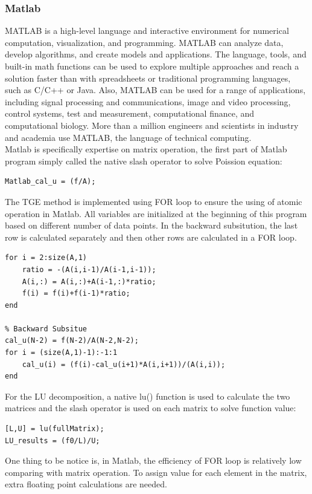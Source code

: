 \documentclass{article}
\begin{document}
\subsubsection{Matlab}
MATLAB is a high-level language and interactive environment for numerical computation, visualization, and programming. MATLAB can analyze data, develop algorithms, and create models and applications. The language, tools, and built-in math functions can be used to explore multiple approaches and reach a solution faster than with spreadsheets or traditional programming languages, such as C/C++ or Java. Also, MATLAB can be used for a range of applications, including signal processing and communications, image and video processing, control systems, test and measurement, computational finance, and computational biology. More than a million engineers and scientists in industry and academia use MATLAB, the language of technical computing. \\
Matlab is specifically expertise on matrix operation, the first part of Matlab program simply called the native slash operator to solve Poission equation:\\
 \begin{lstlisting}[frame=single]  
Matlab_cal_u = (f/A);
 \end{lstlisting}
 
 The TGE method is implemented using FOR loop to ensure the using of atomic operation in Matlab. All variables are initialized at the beginning of this program based on different number of data points. In the backward subsitution, the last row is calculated separately and then other rows are calculated in a FOR loop.
  \begin{lstlisting}[frame=single]  
% Forward Subsitute
for i = 2:size(A,1)
	ratio = -(A(i,i-1)/A(i-1,i-1));
	A(i,:) = A(i,:)+A(i-1,:)*ratio;
	f(i) = f(i)+f(i-1)*ratio;
end

% Backward Subsitue
cal_u(N-2) = f(N-2)/A(N-2,N-2);
for i = (size(A,1)-1):-1:1
	cal_u(i) = (f(i)-cal_u(i+1)*A(i,i+1))/(A(i,i));
end
  \end{lstlisting}
  
  For the LU decomposition, a native lu() function is used to calculate the two matrices and the slash operator is used on each matrix to solve function value:\\
  \begin{lstlisting}[frame=single]  
[L,U] = lu(fullMatrix);
LU_results = (f0/L)/U;
  \end{lstlisting}  
  One thing to be notice is, in Matlab, the efficiency of FOR loop is relatively low comparing with matrix operation. To assign value for each element in the matrix, extra floating point calculations are needed.
\end{document}
